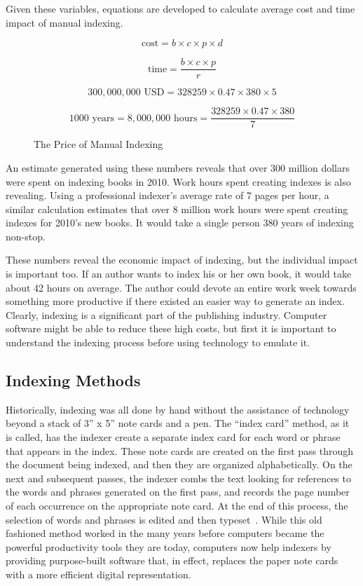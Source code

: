 Given these variables, equations are developed to calculate average cost and time impact of manual indexing.

\begin{figure}[H]
$$ \text{cost} = b \times c \times p \times d $$

$$ \text{time} = \frac{b \times c \times p}{r} $$

$$ 300,000,000 \text{ USD} = 328259 \times 0.47 \times 380 \times 5 $$

$$ 1000 \text{ years} = 8,000,000 \text{ hours} = \frac{328259 \times 0.47 \times 380}{7}$$
\caption{The Price of Manual Indexing}
\end{figure}

An estimate generated using these numbers reveals that over 300 million dollars were spent on indexing books in 2010. Work hours spent creating indexes is also revealing.
Using a professional indexer's average rate of 7 pages per hour, a similar calculation estimates that over 8 million work hours were spent creating indexes for 2010's new books. It would take a single person 380 years of indexing non-stop.

These numbers reveal the economic impact of indexing, but the individual impact is important too.
If an author wants to index his or her own book, it would take about 42 hours on average. The author could devote an entire work week towards something more productive if there existed an easier way to generate an index.
Clearly, indexing is a significant part of the publishing industry.
Computer software might be able to reduce these high costs, but first it is important to understand the indexing process before using technology to emulate it.

\subsection{Indexing Methods}
\label{sec:indexing-methods}

Historically, indexing was all done by hand without the assistance of technology beyond a stack of 3'' x 5'' note cards and a pen.
The ``index card'' method, as it is called, has the indexer create a separate index card for each word or phrase that appears in the index.
These note cards are created on the first pass through the document being indexed, and then they are organized alphabetically.
On the next and subsequent passes, the indexer combs the text looking for references to the words and phrases generated on the first pass, and records the page number of each occurrence on the appropriate note card.
At the end of this process, the selection of words and phrases is edited and then typeset~\cite{mulvany}.
While this old fashioned method worked in the many years before computers became the powerful productivity tools they are today, computers now help indexers by providing purpose-built software that, in effect, replaces the paper note cards with a more efficient digital representation.

